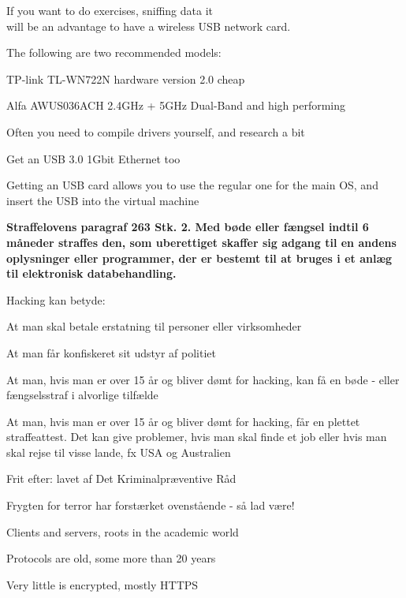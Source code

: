 \documentclass[Screen16to9,17pt]{foils}
\begin{document}

If you want to do exercises, sniffing data it \\
will be an advantage to have a wireless USB network card.
\begin{list2}
\item The following are two recommended models:
\item TP-link TL-WN722N hardware version 2.0 cheap
\item Alfa AWUS036ACH 2.4GHz + 5GHz Dual-Band and high performing
\item Often you need to compile drivers yourself, and research a bit
\item Get an USB 3.0 1Gbit Ethernet too
\end{list2}

Getting an USB card allows you to use the regular one for the main OS, and insert the USB into the virtual machine


\vskip 1cm
{\bfseries Straffelovens paragraf 263 Stk. 2. Med bøde eller fængsel
  indtil 6 måneder
straffes den, som uberettiget skaffer sig adgang til en andens
oplysninger eller programmer, der er bestemt til at bruges i et anlæg
til elektronisk databehandling.}

Hacking kan betyde:
\begin{list2}
\item At man skal betale erstatning til personer eller virksomheder
\item At man får konfiskeret sit udstyr af politiet
\item At man, hvis man er over 15 år og bliver dømt for hacking, kan
  få en bøde - eller fængselsstraf i alvorlige tilfælde
\item At man, hvis man er over 15 år og bliver dømt for hacking, får
en plettet straffeattest. Det kan give problemer, hvis man skal finde
et job eller hvis man skal rejse til visse lande, fx USA og
Australien
\item Frit efter:  lavet af Det
  Kriminalpræventive Råd
\item Frygten for terror har forstærket ovenstående - så lad være!
\end{list2}






\begin{list1}
\item Clients and servers, roots in the academic world
\item Protocols are old, some more than 20 years
\item Very little is encrypted, mostly HTTPS
\end{list1}
\end{document}
